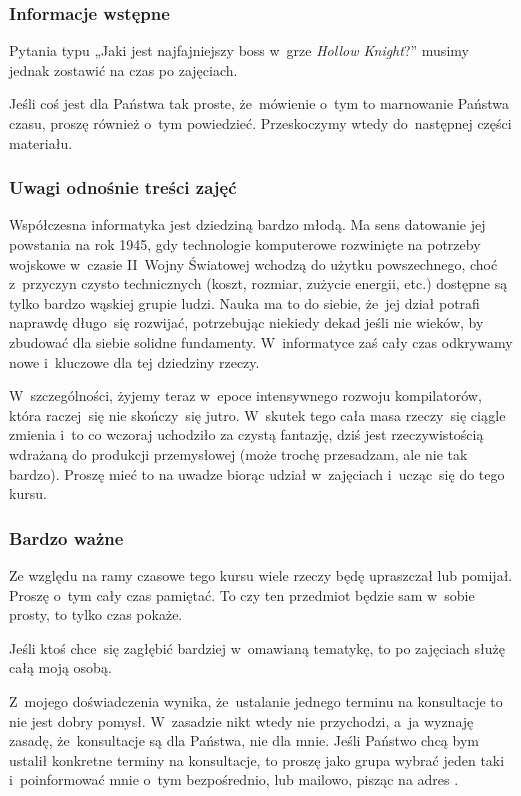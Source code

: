\documentclass[10pt,t]{beamer}
\begin{document}
\begin{frame}
  \frametitle{Informacje wstępne}


  Pytania typu „Jaki jest najfajniejszy boss w~grze \textit{Hollow
    Knight}?” musimy jednak zostawić na czas po zajęciach.

  Jeśli coś jest dla Państwa tak proste, że~mówienie o~tym to marnowanie
  Państwa czasu, proszę również o~tym powiedzieć. Przeskoczymy wtedy
  do~następnej części materiału.

\end{frame}





\begin{frame}
  \frametitle{Uwagi odnośnie treści zajęć}


  Współczesna informatyka jest dziedziną bardzo młodą. Ma sens datowanie
  jej powstania na rok 1945, gdy technologie komputerowe rozwinięte na
  potrzeby wojskowe w~czasie II~Wojny Światowej wchodzą do użytku
  powszechnego, choć z~przyczyn czysto technicznych (koszt, rozmiar,
  zużycie energii, etc.) dostępne są tylko bardzo wąskiej
  grupie ludzi. Nauka ma to do siebie, że~jej dział potrafi naprawdę
  długo~się rozwijać, potrzebując niekiedy dekad jeśli nie wieków, by
  zbudować dla siebie solidne fundamenty. W~informatyce zaś cały czas
  odkrywamy nowe i~kluczowe dla tej dziedziny rzeczy.

  W~szczególności, żyjemy teraz w~epoce intensywnego rozwoju kompilatorów,
  która raczej~się nie skończy~się jutro. W~skutek tego cała masa rzeczy~się
  ciągle zmienia i~to co wczoraj uchodziło za czystą fantazję, dziś jest
  rzeczywistością wdrażaną do produkcji przemysłowej (może trochę
  przesadzam, ale nie tak bardzo). Proszę mieć to na uwadze biorąc udział
  w~zajęciach i~ucząc~się do tego kursu.

\end{frame}





\begin{frame}
  \frametitle{Bardzo ważne}


  Ze względu na ramy czasowe tego kursu wiele rzeczy będę
  \alert{upraszczał} lub \alert{pomijał}. Proszę o~tym cały czas pamiętać.
  To czy ten przedmiot będzie sam w~sobie \alert{prosty}, to tylko czas
  pokaże.

  Jeśli ktoś chce~się zagłębić bardziej w~omawianą tematykę, to po
  zajęciach służę całą moją osobą.

  Z~mojego doświadczenia wynika, że~ustalanie jednego terminu na konsultacje
  to nie jest dobry pomysł. W~zasadzie nikt wtedy nie przychodzi, a~ja
  wyznaję zasadę, że~konsultacje są dla Państwa, nie dla mnie. Jeśli
  Państwo chcą bym ustalił konkretne terminy na konsultacje, to proszę jako
  grupa wybrać jeden taki i~poinformować mnie o~tym bezpośrednio, lub
  mailowo, pisząc na adres \email.

\end{frame}
\end{document}
